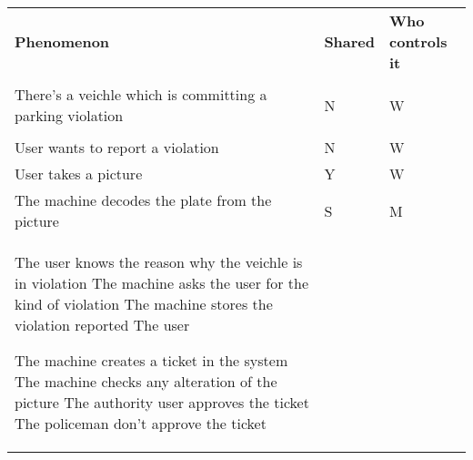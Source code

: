 \begin{table}[]
\begin{tabular}{|l|l|l|}
 \hline
\textbf{Phenomenon} & \textbf{Shared} & \textbf{Who controls it} \\ \\ \hline
There's a veichle which is committing a parking violation & N & W \\ \\ \hline
User wants to report a violation & N & W \\ \hline
User takes a picture & Y & W \\ \hline
The machine decodes the plate from the picture & S & M \\ \hline
The user knows the reason why the veichle is in violation
The machine asks the user for the kind of violation
The machine stores the violation reported
The user


The machine creates a ticket in the system
The machine checks any alteration of the picture
The authority user approves the ticket
The policeman don't approve the ticket

 \hline
\end{tabular}
\end{table}
